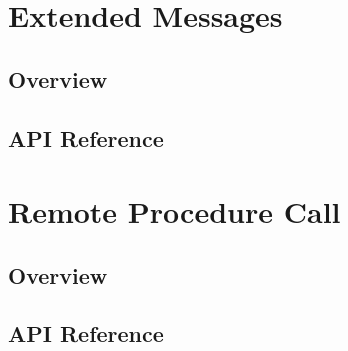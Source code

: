\section{Extended Messages}


\subsection{Overview}

\subsection{API Reference}


\section{Remote Procedure Call}

\subsection{Overview}

\subsection{API Reference}


